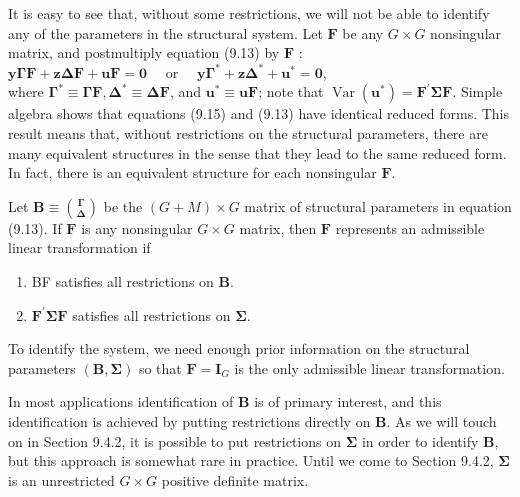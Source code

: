 \documentclass[10pt]{article}
\begin{document}
It is easy to see that, without some restrictions, we will not be able to identify any of the parameters in the structural system. Let $\mathbf{F}$ be any $G \times G$ nonsingular matrix, and postmultiply equation (9.13) by $\mathbf{F}$ :\\
$\mathbf{y} \boldsymbol{\Gamma} \mathbf{F}+\mathbf{z} \boldsymbol{\Delta} \mathbf{F}+\mathbf{u} \mathbf{F}=\mathbf{0} \quad$ or $\quad \mathbf{y} \boldsymbol{\Gamma}^{*}+\mathbf{z} \boldsymbol{\Delta}^{*}+\mathbf{u}^{*}=\mathbf{0}$,\\
where $\boldsymbol{\Gamma}^{*} \equiv \boldsymbol{\Gamma} \mathbf{F}, \boldsymbol{\Delta}^{*} \equiv \boldsymbol{\Delta} \mathbf{F}$, and $\mathbf{u}^{*} \equiv \mathbf{u F}$; note that $\operatorname{Var}\left(\mathbf{u}^{*}\right)=\mathbf{F}^{\prime} \boldsymbol{\Sigma} \mathbf{F}$. Simple algebra shows that equations (9.15) and (9.13) have identical reduced forms. This result means that, without restrictions on the structural parameters, there are many equivalent structures in the sense that they lead to the same reduced form. In fact, there is an equivalent structure for each nonsingular $\mathbf{F}$.

Let $\mathbf{B} \equiv\binom{\boldsymbol{\Gamma}}{\boldsymbol{\Delta}}$ be the $(G+M) \times G$ matrix of structural parameters in equation (9.13). If $\mathbf{F}$ is any nonsingular $G \times G$ matrix, then $\mathbf{F}$ represents an admissible linear transformation if

\begin{enumerate}
  \item BF satisfies all restrictions on $\mathbf{B}$.
  \item $\mathbf{F}^{\prime} \mathbf{\Sigma} \mathbf{F}$ satisfies all restrictions on $\mathbf{\Sigma}$.
\end{enumerate}

To identify the system, we need enough prior information on the structural parameters $(\mathbf{B}, \boldsymbol{\Sigma})$ so that $\mathbf{F}=\mathbf{I}_{G}$ is the only admissible linear transformation.

In most applications identification of $\mathbf{B}$ is of primary interest, and this identification is achieved by putting restrictions directly on $\mathbf{B}$. As we will touch on in Section 9.4.2, it is possible to put restrictions on $\boldsymbol{\Sigma}$ in order to identify $\mathbf{B}$, but this approach is somewhat rare in practice. Until we come to Section 9.4.2, $\boldsymbol{\Sigma}$ is an unrestricted $G \times G$ positive definite matrix.
\end{document}
